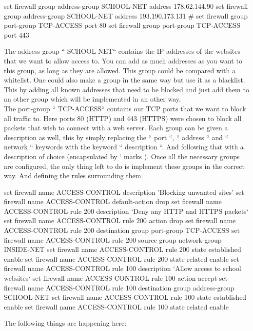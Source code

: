 \begin{cisco}[title= address and port groups configuration]
set firewall group address-group SCHOOL-NET address 178.62.144.90
set firewall group address-group SCHOOL-NET address 193.190.173.131
# 
set firewall group port-group TCP-ACCESS port 80
set firewall group port-group TCP-ACCESS port 443
\end{cisco}
The address-group `` SCHOOL-NET`` contains the IP addresses of the websites that we want to allow access to. You can add as much addresses as you want to this group, as long as they are allowed. This group could be compared with a whitelist. One could also make a group in the same way but use it as a blacklist. This by adding all known addresses that need to be blocked and just add them to an other group which will be implemented in an other way.\\
The port-group `` TCP-ACCESS`` contains our TCP ports that we want to block all traffic to. Here ports 80 (HTTP) and 443 (HTTPS) were chosen to block all packets that wish to connect with a web server. Each group can be given a description as well, this by simply replacing the `` port ``, `` address `` and `` network `` keywords with the keyword `` description ``.  And following that with a description of choice (encapsulated by ` marks ). Once all the necessary groups are configured, the only thing left to do is implement these groups in the correct way. And defining the rules surrounding them.\\
\begin{cisco}[title= Configuring the firewall rules]
set firewall name ACCESS-CONTROL description 'Blocking unwanted sites'
set firewall name ACCESS-CONTROL default-action drop
set firewall name ACCESS-CONTROL rule 200 description `Deny any HTTP and HTTPS packets`
set firewall name ACCESS-CONTROL rule 200 action drop
set firewall name ACCESS-CONTROL rule 200 destination group port-group TCP-ACCESS
set firewall name ACCESS-CONTROL rule 200 source group network-group INSIDE-NET
set firewall name ACCESS-CONTROL rule 200 state established enable
set firewall name ACCESS-CONTROL rule 200 state related enable
set firewall name ACCESS-CONTROL rule 100 description `Allow access to school websites`
set firewall name ACCESS-CONTROL rule 100 action accept
set firewall name ACCESS-CONTROL rule 100 destination group address-group SCHOOL-NET
set firewall name ACCESS-CONTROL rule 100 state established enable
set firewall name ACCESS-CONTROL rule 100 state related enable
\end{cisco}
The following things are happening here:
